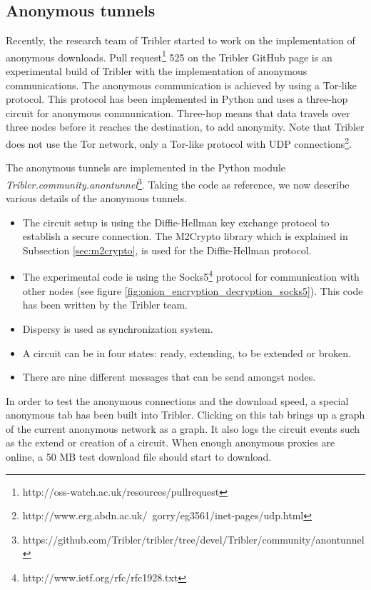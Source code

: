 	\subsection{Anonymous tunnels}
		\label{sec:anonymoustunnels}
			Recently, the research team of Tribler started to work on the implementation of anonymous downloads. Pull request\footnote{http://oss-watch.ac.uk/resources/pullrequest} 525 on the Tribler GitHub page \cite{pullrequest525} is an experimental build of Tribler with the implementation of anonymous communications. The anonymous communication is achieved by using a Tor-like protocol. This protocol has been implemented in Python and uses a three-hop circuit for anonymous communication. Three-hop means that data travels over three nodes before it reaches the destination, to add anonymity. Note that Tribler does not use the Tor network, only a Tor-like protocol with UDP connections\footnote{http://www.erg.abdn.ac.uk/~gorry/eg3561/inet-pages/udp.html}.
			
			The anonymous tunnels are implemented in the Python module \emph{Tribler.community.anontunnel}\footnote{https://github.com/Tribler/tribler/tree/devel/Tribler/community/anontunnel}. Taking the code as reference, we now describe various details of the anonymous tunnels.
			
			\begin{itemize} 
				\item The circuit setup is using the Diffie-Hellman key exchange protocol to establish a secure connection. The M2Crypto library which is explained in Subsection \ref{sec:m2crypto}, is used for the Diffie-Hellman protocol.
				\item The experimental code is using the Socks5\footnote{http://www.ietf.org/rfc/rfc1928.txt} protocol for communication with other nodes (see figure \ref{fig:onion_encryption_decryption_socks5}). This code has been written by the Tribler team.
				\item Dispersy is used as synchronization system. 
				\item A circuit can be in four states: ready, extending, to be extended or broken.
				\item There are nine different messages that can be send amongst nodes.
			\end{itemize}
			
			In order to test the anonymous connections and the download speed, a special anonymous tab has been built into Tribler. Clicking on this tab brings up a graph of the current anonymous network as a graph. It also logs the circuit events such as the extend or creation of a circuit. When enough anonymous proxies are online, a 50 MB test download file should start to download.
			
